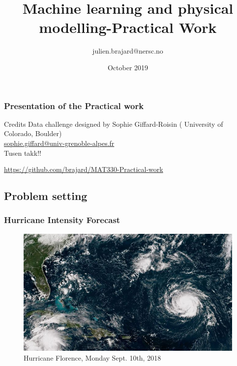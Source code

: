 \documentclass[handout]{beamer}
\title[Machine Learning]{Machine learning and physical modelling-Practical Work}
\author[J. Brajard]{julien.brajard@nersc.no}
\institute[NERSC]{NERSC\\
\url{https://github.com/brajard/MAT330-Practical-work}}
\date{October 2019}
\begin{document}
\begin{frame}
\titlepage
\end{frame}
\begin{frame}
\frametitle{Presentation of the Practical work}
\begin{block}{Credits}
Data challenge designed by Sophie Giffard-Roisin (
University of Colorado, Boulder)\\
\href{mailtosophie.giffard@univ-grenoble-alpes.fr}{sophie.giffard@univ-grenoble-alpes.fr}\\
Tusen takk!!
\end{block}
\url{https://github.com/brajard/MAT330-Practical-work}


\end{frame}

\subsection{Problem setting}

\begin{frame}
\frametitle{Hurricane Intensity Forecast} %
\begin{figure}
	\includegraphics[width=0.7\linewidth]{fig/L1/hurricane-florence-2018-monday-radar.jpg}
	\caption*{Hurricane Florence, Monday Sept. 10th, 2018}
\end{figure}
\end{frame}
\end{document}
